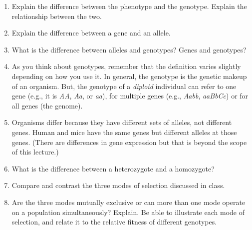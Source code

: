 \documentclass[letterpaper]{tufte-handout}
\begin{document}
\begin{enumerate}

	\item Explain the difference between the phenotype and the genotype. Explain the relationship between the two.
	
	\item Explain the difference between a gene and an allele. 

	\item What is the difference between alleles and genotypes?  Genes and genotypes?

	\item As you think about genotypes, remember that the definition varies slightly depending on how you use it. In general, the genotype is the genetic makeup of an organism. But, the genotype of a \emph{diploid} individual can refer to one gene (e.g., it is \emph{AA}, \emph{Aa}, or \emph{aa}), for multiple genes (e.g., \emph{Aabb}, \emph{aaBbCc}) or for all genes (the genome).

	\item Organisms differ because they have different sets of alleles, not different genes. Human and mice have the same genes but different alleles at those genes.  (There are differences in gene expression but that is beyond the scope of this lecture.)
 
	\item What is the difference between a heterozygote and a homozygote?

	\item Compare and contrast the three modes of selection discussed in class.  
	
	
	\item  Are the three modes mutually exclusive or can more than one mode operate on a population simultaneously? Explain.  Be able to illustrate each mode of selection, and relate it to the relative fitness of different genotypes.  
	

\end{enumerate}
\end{document}
